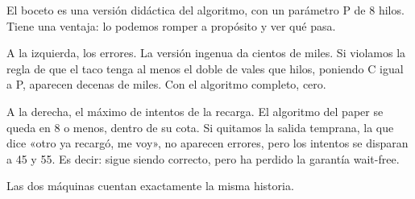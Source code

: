 El boceto es una versión didáctica del algoritmo, con un parámetro P de 8 hilos. Tiene una ventaja: lo podemos romper a propósito y ver qué pasa.

A la izquierda, los errores. La versión ingenua da cientos de miles. Si violamos la regla de que el taco tenga al menos el doble de vales que hilos, poniendo C igual a P, aparecen decenas de miles. Con el algoritmo completo, cero.

A la derecha, el máximo de intentos de la recarga. El algoritmo del paper se queda en 8 o menos, dentro de su cota. Si quitamos la salida temprana, la que dice «otro ya recargó, me voy», no aparecen errores, pero los intentos se disparan a 45 y 55. Es decir: sigue siendo correcto, pero ha perdido la garantía wait-free.

Las dos máquinas cuentan exactamente la misma historia.

